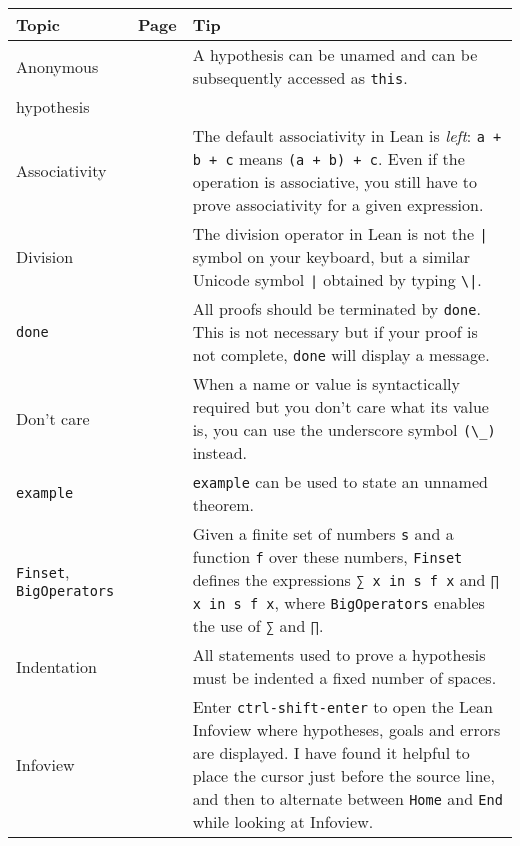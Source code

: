 \begin{tabular}{p{}|r|p{}}
\hline
Topic & Page & Tip\\
\hline
Anonymous&\pageref{p.this}&A hypothesis can be unamed and can be subsequently accessed as \Verb+this+.\\
hypothesis&\\\hline
Associativity&\pageref{p.associativity}&The default associativity in Lean is \emph{left}: \verb!a + b + c! means \verb!(a + b) + c!. Even if the operation is associative, you still have to prove associativity for a given expression.\\\hline

Division&\pageref{p.division}&The division operator in Lean is not the \Verb+|+ symbol on your keyboard, but a similar Unicode symbol \Verb+∣+ obtained by typing \Verb+\|+.\\\hline

\Verb+done+&\pageref{p.done}&All proofs should be terminated by \Verb+done+. This is not necessary but if your proof is not complete, \Verb+done+ will display a message.\\\hline

Don't care&\pageref{p.dont-care}&When a name or value is syntactically required but you don't care what its value is, you can use the underscore symbol \Verb+(\_)+ instead.\\\hline

\Verb+example+&\pageref{p.example}&\Verb+example+ can be used to state an unnamed theorem.\\\hline

\Verb+Finset+, \Verb+BigOperators+&\pageref{p.finset}&Given a finite set of numbers \Verb+s+ and a function \Verb+f+ over these numbers, \Verb+Finset+ defines the expressions \Verb+∑ x in s f x+ and \Verb+∏ x in s f x+, where \Verb+BigOperators+ enables the use of  \Verb+∑+ and \Verb+∏+.\\\hline

Indentation&\pageref{p.indentation}&All statements used to prove a hypothesis must be indented a fixed number of spaces.\\\hline

Infoview&\pageref{p.infoview}&Enter \Verb+ctrl-shift-enter+ to open the Lean Infoview where hypotheses, goals and errors are displayed. I have found it helpful to place the cursor just before the source line, and then to alternate between \Verb+Home+ and \Verb+End+ while looking at Infoview.\\\hline


\end{tabular}
